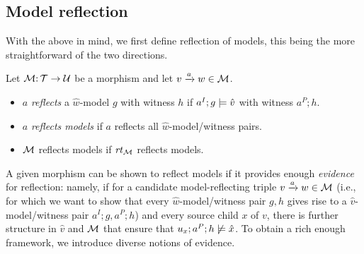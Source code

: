 \subsection{Model reflection}

With the above in mind, we first define reflection of models, this being the more straightforward of the two directions.

\begin{definition}
Let ${\mathcal{M}}{:}\, {\mathcal{T}}\rightarrow{\mathcal{U}}$ be a morphism and let ${v}\xrightarrow{a}{w}\in{\mathcal{M}}$.
\begin{itemize}
\item $a$ \emph{reflects} a $\hat w$-model $g$ with witness $h$ if $a^I;g\models \hat v$ with witness $a^P;h$.

\item $a$ \emph{reflects models} if $a$ reflects all $\hat w$-model/witness pairs.

\item ${\mathcal{M}}$ reflects models if $\mathit{rt}_{{\mathcal{M}}}$ reflects models.
\end{itemize}
\end{definition}
%
A given morphism can be shown to reflect models if it provides enough \emph{evidence} for reflection: namely, if for a candidate model-reflecting triple ${v}\xrightarrow{a}{w}\in {\mathcal{M}}$ (i.e., for which we want to show that every $\hat w$-model/witness pair $g,h$ gives rise to a $\hat v$-model/witness pair $a^I;g,a^P;h$) and every source child $x$ of $v$, there is further structure in $\hat v$ and ${\mathcal{M}}$ that ensure that $u_x;a^P;h\not\models \hat x$. To obtain a rich enough framework, we introduce diverse notions of evidence.


